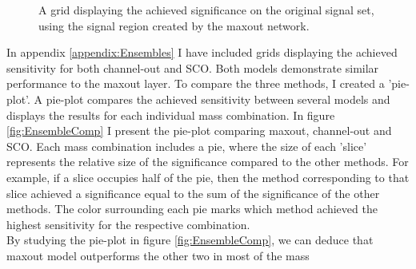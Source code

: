 \begin{figure}
    \caption{A grid displaying the achieved significance on the original signal set, using the signal region 
    created by the maxout network.}
    \label{fig:MaxOutGridSig}
\end{figure}
In appendix \ref{appendix:Ensembles} I have included grids displaying the achieved sensitivity for both channel-out and \ac{SCO}. Both 
models demonstrate similar performance to the maxout layer. To compare the three methods, I created a 'pie-plot'. A pie-plot 
compares the achieved sensitivity between several models and displays the results for each individual mass combination.  In figure 
\ref{fig:EnsembleComp} I present the pie-plot comparing maxout, channel-out and \ac{SCO}. Each mass combination includes a pie, where 
the size of each 'slice' represents the relative size of the significance compared to the other methods. For example, if a slice occupies 
half of the pie, then the method corresponding to that slice achieved a significance equal to the sum of the significance of the other methods.
The color surrounding each pie marks which method achieved the highest sensitivity for the respective combination.
\\
By studying the pie-plot in figure \ref{fig:EnsembleComp}, we can deduce that maxout model outperforms the other two in most of the mass 

